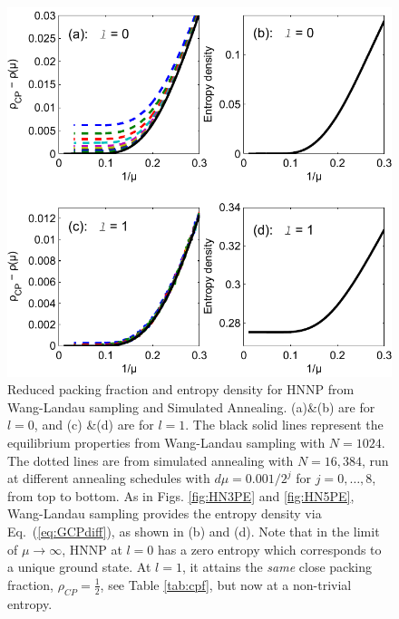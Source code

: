 \begin{figure}
\centering \includegraphics[width=0.95\columnwidth]{Chapter-2/Paper_HNNP_PE_Plot}
\protect\caption{Reduced packing fraction and entropy density for HNNP from Wang-Landau
sampling and Simulated Annealing. (a)\&(b) are for $l=0$, and (c)
\&(d) are for $l=1$. The black solid lines represent the equilibrium
properties from Wang-Landau sampling with $N=1024$. The dotted lines
are from simulated annealing with $N=16,384$, run at different annealing
schedules with $d\mu=0.001/2^{j}$ for $j=0,\ldots,8$, from top to
bottom. As in Figs. \ref{fig:HN3PE} and \ref{fig:HN5PE}, Wang-Landau
sampling provides the entropy density via Eq.~(\ref{eq:GCPdiff}),
as shown in (b) and (d). Note that in the limit of $\mu\to\infty$,
HNNP at $l=0$ has a zero entropy which corresponds to a unique ground
state. At $l=1$, it attains the \emph{same} close packing fraction,
$\rho_{CP}=\frac{1}{2}$, see Table \ref{tab:cpf}, but now at a non-trivial
entropy. }
\label{fig:HNNPPE} 
\end{figure}


